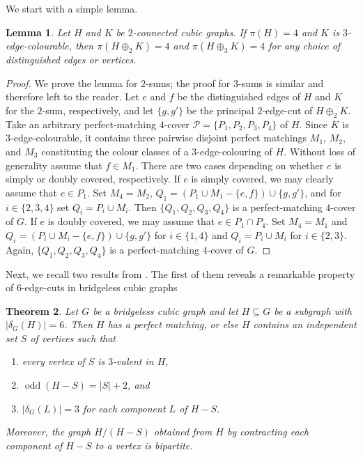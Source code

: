\documentclass[a4paper]{amsart}
\newcommand{\odd}{\operatorname{odd}\xspace}
\theoremstyle{plain}
\newtheorem{theorem}{Theorem}[section]
\newtheorem{lemma}[theorem]{Lemma}
\theoremstyle{definition}
\begin{document}
We start with a simple lemma.

\begin{lemma}\label{lem:2+3-sum-4cover}
Let $H$ and $K$ be $2$-connected cubic graphs. If $\pi(H)=4$
and $K$ is $3$-edge-colourable, then $\pi(H\oplus_2 K)=4$ and
$\pi(H\oplus_3 K)=4$ for any choice of distinguished edges or
vertices.
\end{lemma}

\begin{proof}
We prove the lemma for $2$-sums; the proof for $3$-sums is
similar and therefore left to the reader. Let $e$ and $f$ be
the distinguished edges of $H$ and $K$ for the $2$-sum,
respectively, and let $\{g,g'\}$ be the principal $2$-edge-cut
of $H\oplus_2 K$. Take an arbitrary perfect-matching $4$-cover
$\mathcal{P}=\{P_1,P_2,P_3,P_4\}$ of $H$. Since $K$ is
$3$-edge-colourable, it contains three pairwise disjoint
perfect matchings $M_1$, $M_2$, and $M_3$ constituting the
colour classes of a 3-edge-colouring of $H$. Without loss of
generality assume that $f\in M_1$. There are two cases
depending on whether $e$ is simply or doubly covered,
respectively. If $e$ is simply covered, we may clearly assume
that $e\in P_1$. Set $M_4=M_2$, $Q_1=(P_1\cup
M_1-\{e,f\})\cup\{g,g'\}$, and for $i\in\{2,3,4\}$ set
$Q_i=P_i\cup M_i$. Then $\{Q_1,Q_2,Q_3,Q_4\}$ is a
perfect-matching $4$-cover of $G$. If $e$ is doubly covered, we
may assume that $e\in P_1\cap P_4$. Set $M_4=M_1$ and
$Q_i=(P_i\cup M_i-\{e,f\})\cup\{g,g'\}$ for $i\in\{1,4\}$ and
$Q_i=P_i\cup M_i$ for $i\in\{2,3\}$. Again,
$\{Q_1,Q_2,Q_3,Q_4\}$ is a perfect-matching $4$-cover of $G$.
\end{proof}

Next, we recall two results from \cite{KMNS-Berge}. The first
of them reveals a remarkable property of $6$-edge-cuts in
bridgeless cubic graphs

\begin{theorem}\label{thm:6cuts}
Let $G$ be a bridgeless cubic graph and let $H\subseteq G$ be a
subgraph with $|\delta_G(H)|=6$. Then $H$ has a perfect
matching, or else $H$ contains an independent set $S$ of
vertices such that
\begin{enumerate}[{\rm (i)}]
\item every vertex of $S$ is $3$-valent in $H$,
\item $\odd(H-S) =|S|+ 2$, and
\item $|\delta_G(L)| = 3$ for each component $L$ of $H-S$.
\end{enumerate}
Moreover, the graph $H/(H-S)$ obtained from $H$ by contracting
each component of $H-S$ to a vertex is bipartite.
\end{theorem}
\end{document}
